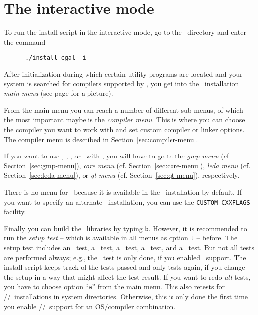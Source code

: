
\section{The interactive mode}\label{sec:interactive-mode}

To run the install script in the interactive mode, go to the \cgaldir\ 
directory and enter the command
\begin{verbatim}
      ./install_cgal -i
\end{verbatim}

After initialization during which certain utility programs are located
and your system is searched for compilers supported by \cgal, you get
into the \cgal\ installation \textit{main menu} (see page
\pageref{pic:main-menu} for a picture).

From the main menu you can reach a number of different sub-menus, of
which the most important maybe is the \textit{compiler menu}. This is
where you can choose the compiler you want to work with and set custom
compiler or linker options. The compiler menu is described in
Section~\ref{sec:compiler-menu}.

If you want to use \gmp, \core, \leda, or \qt\ with \cgal, you will
have to go to the \textit{gmp menu} (cf. Section~\ref{sec:gmp-menu}),
\textit{core menu} (cf. Section~\ref{sec:core-menu}), \textit{leda
  menu} (cf. Section~\ref{sec:leda-menu}), or \textit{qt menu} (cf.
Section~\ref{sec:qt-menu}), respectively.

There is no menu for \boost\ because it is available in the
\cgal\ installation by default.  If you want to specify an
alternate \boost\ installation, you can use the \texttt{CUSTOM\_CXXFLAGS}
facility.

Finally you can build the \cgal\ libraries by typing \texttt{b}.
However, it is recommended to run the \textit{setup test} -- which is
available in all menus as option \texttt{t} -- before. The setup test
includes an \stl\ test, a \gmp\ test, a \core\ test, a \leda\ test,
and a \qt\ test.  But not all tests are performed always; e.g., the
\gmp\ test is only done, if you enabled \gmp\ support. The install
script keeps track of the tests passed and only tests again, if you
change the setup in a way that might affect the test result. If you
want to redo \textit{all} tests, you have to choose option
``\texttt{a}'' from the main menu.  This also retests for
\gmp/\leda/\qt\ installations in system directories. Otherwise, this
is only done the first time you enable \gmp/\leda/\qt\ support for an
OS/compiler combination.

